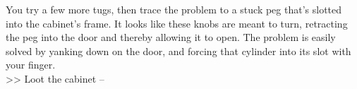 You try a few more tugs, then trace the problem to a stuck peg that’s slotted into the cabinet’s frame. It looks like these knobs are meant to turn, retracting the peg into the door and thereby allowing it to open. The problem is easily solved by yanking down on the door, and forcing that cylinder into its slot with your finger.\\

>> Loot the cabinet -- 